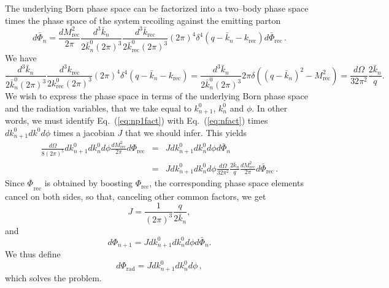 \documentclass[11pt,a4paper]{article}
\newcommand{\tmop}[1]{\ensuremath{\operatorname{#1}}}
\begin{document}
The underlying Born phase space can be factorized into a two--body phase space
times the phase space of the system recoiling against the emitting parton
\begin{equation}
  d \bar{\Phi}_n = \frac{dM_{\tmop{rec}}^2}{2 \pi} \frac{d^3 \bar{k}_n}{2
  \bar{k}_n^0 (2 \pi)^3} \frac{d^3 \bar{k}_{\tmop{rec}}}{2
  \bar{k}_{\tmop{rec}}^0 (2 \pi)^3} (2 \pi)^4 \delta^4 (q - \bar{k}_n -
  k_{\tmop{rec}}) d \bar{\Phi}_{\tmop{rec}} \, . \label{eq:nfact}
\end{equation}
We have
\begin{equation}
  \frac{d^3 \bar{k}_n}{2 \bar{k}_n^0 (2 \pi)^3} \frac{d^3 k_{\tmop{rec}}}{2
  k_{\tmop{rec}}^0 (2 \pi)^3} (2 \pi)^4 \delta^4 (q - \bar{k}_n -
  k_{\tmop{rec}}) = \frac{d^3 \bar{k}_n}{2 \bar{k}_n^0 (2 \pi)^3} 2 \pi \delta
  \left( (q - \bar{k}_n)^2 - M_{\tmop{rec}}^2 \right) = \frac{d \Omega}{32
  \pi^2} \frac{2 \bar{k}_n}{q} .
\end{equation}
We wish to express the phase space in terms of the underlying Born phase
space and the radiation variables, that we take equal to $k^0_{n + 1}$,
$k^0_n$ and $\phi$. In other words, we must identify Eq.~(\ref{eq:np1fact})
with Eq.~(\ref{eq:nfact}) times $dk^0_{n+1}dk^0 d\phi$ times
a jacobian $J$ that we should infer. This yields
\begin{eqnarray}
  \frac{d \Omega}{8 (2 \pi)^5} dk_{n + 1}^0 dk_n^0 d \phi
  \frac{dM_{\tmop{rec}}^2}{2 \pi} d \Phi_{\tmop{rec}} & = & Jdk_{n + 1}^0
  dk_n^0 d \phi d \bar{\Phi}_n \nonumber\\
  & = & Jdk_{n + 1}^0 dk_n^0 d \phi \frac{d \Omega}{32 \pi^2} \frac{2
  \bar{k}_n}{q} \frac{dM_{\tmop{rec}}^2}{2 \pi} d \bar{\Phi}_{\tmop{rec}} \, .
\end{eqnarray}
Since $\overline{\Phi_{}}_{\tmop{rec}}$ is obtained by boosting
$\Phi_{\tmop{rec}}$, the corresponding phase space elements cancel on both
sides, so that, canceling other common factors, we get
\begin{equation}
  J = \frac{1}{(2 \pi)^3} \frac{q}{2 \bar{k}_n},
\end{equation}
and
\begin{equation}
  d \Phi_{n + 1} = Jdk_{n + 1}^0 dk_n^0 d \phi d \bar{\Phi}_n .
\end{equation}
We thus define
\begin{equation}
  d \Phi_{\tmop{rad}} = Jdk_{n + 1}^0 dk_n^0 d \phi \, ,
\end{equation}
which solves the problem.
\end{document}
